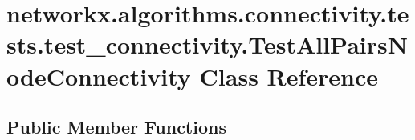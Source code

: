 \hypertarget{classnetworkx_1_1algorithms_1_1connectivity_1_1tests_1_1test__connectivity_1_1TestAllPairsNodeConnectivity}{}\section{networkx.\+algorithms.\+connectivity.\+tests.\+test\+\_\+connectivity.\+Test\+All\+Pairs\+Node\+Connectivity Class Reference}
\label{classnetworkx_1_1algorithms_1_1connectivity_1_1tests_1_1test__connectivity_1_1TestAllPairsNodeConnectivity}
\subsection*{Public Member Functions}
